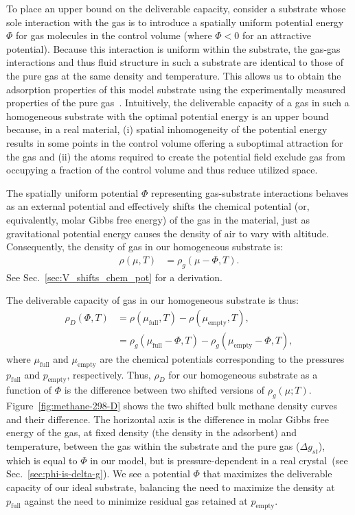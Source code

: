 \documentclass[pre,twocolumn]{revtex4-2}
\newcommand\V{\Phi}
\newcommand\pfull{\ensuremath{p_{\text{full}}}}
\newcommand\pempty{\ensuremath{p_{\text{empty}}}}
\newcommand\mufull{\ensuremath{\mu_{\text{full}}}}
\newcommand\muempty{\ensuremath{\mu_{\text{empty}}}}
\newcommand\gst{\ensuremath{\Delta g_{st}}}
\begin{document}
To place an upper bound on the deliverable capacity, consider a substrate whose
sole interaction with the gas is to introduce a spatially uniform potential
energy $\V$ for gas molecules in the control volume (where $\V<0$ for an
attractive potential). Because this interaction is uniform within the
substrate, the gas-gas interactions and thus fluid structure in such a
substrate are identical to those of the pure gas at the same density and
temperature. This allows us to obtain the adsorption properties of this model
substrate using the experimentally measured properties of the pure
gas~\cite{nist}. Intuitively, the deliverable capacity of a gas in such a
homogeneous substrate with the optimal potential energy is an upper bound
because, in a real material, (i) spatial inhomogeneity of the potential
energy results in some points in the control volume offering a suboptimal
attraction for the gas and (ii) the atoms required to create the potential
field exclude gas from occupying a fraction of the control volume and thus reduce utilized space.

The spatially uniform potential $\V$ representing gas-substrate interactions
behaves as an external potential and effectively shifts the chemical potential
(or, equivalently, molar Gibbs free energy) of the gas in the material, just as
gravitational potential energy causes the density of air to vary with altitude.
Consequently, the density of gas in our homogeneous substrate is:
\begin{align}
    \rho(\mu,T) &= \rho_g(\mu - \V,T). \label{eq:mof-density}
\end{align}
See Sec.~\ref{sec:V_shifts_chem_pot} for a derivation.

The deliverable capacity of gas in our homogeneous substrate is thus:
\begin{align}
    \rho_D(\V,T) &= \rho(\mufull,T) - \rho(\muempty,T),
    \label{eq:DofPhi}
    \\
    &= \rho_g(\mufull-\V,T) - \rho_g(\muempty-\V,T),
\end{align}
where $\mufull$ and $\muempty$ are the chemical potentials corresponding to the
pressures $\pfull$ and $\pempty$, respectively. Thus, $\rho_D$ for our
homogeneous substrate as a function of $\V$ is the difference between two
shifted versions of $\rho_g(\mu; T)$. Figure~\ref{fig:methane-298-D} shows the
two shifted bulk methane density curves and their difference. The horizontal
axis is the difference in molar Gibbs free energy of the gas, at fixed density (the density in the adsorbent) and temperature, between the gas within the substrate and the pure gas (\gst),
which is equal to $\V$ in our model, but is pressure-dependent in a real
crystal~(see Sec.~\ref{sec:phi-is-delta-g}). We see a potential $\V$ that
maximizes the deliverable capacity of our ideal substrate, balancing the need
to maximize the density at $\pfull$ against the need to minimize residual gas
retained at $\pempty$.
\end{document}
